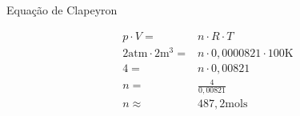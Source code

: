 Equação de Clapeyron
\begin{ceqn}
    \begin{align*}
        p \cdot V =& n \cdot R \cdot T \\
        2 \text{atm} \cdot 2 \text{m}^3 =& n \cdot 0,0000821 \cdot 100 \text{K} \\
        4 =& n \cdot {0,00821} \\
        n =& \frac{4}{0,00821} \\
        n \approx& 487,2 \text{mols}\\
    \end{align*}
\end{ceqn}


